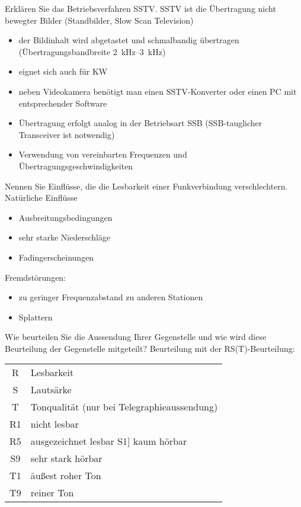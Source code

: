 \documentclass[avery5371,grid,frame,a4paper]{flashcards}
\newcommand{\card}[3]{
  \begin{flashcard}[{\chap} -- #1]{#2}#3\end{flashcard}
}
\begin{document}
\card{67}{Erklären Sie das Betriebsverfahren SSTV.}{
  \footnotesize
  SSTV ist die Übertragung nicht bewegter Bilder (Standbilder, Slow Scan Television)
  \begin{itemize}
    \item der Bildinhalt wird abgetastet und schmalbandig übertragen (Übertragungsbandbreite \SIrange{2}{3}{\kilo\Hz})
    \item eignet sich auch für KW
    \item neben Videokamera benötigt man einen SSTV-Konverter oder einen PC mit entsprechender Software
    \item Übertragung erfolgt analog in der Betriebsart SSB (SSB-tauglicher Transceiver ist notwendig)
    \item Verwendung von vereinbarten Frequenzen und Übertragungsgeschwindigkeiten
  \end{itemize}
}
\card{68}{Nennen Sie Einflüsse, die die Lesbarkeit einer Funkverbindung verschlechtern.}{
  \small
  Natürliche Einflüsse
  \begin{itemize}
    \item Ausbreitungsbedingungen
    \item sehr starke Niederschläge
    \item Fadingerscheinungen
  \end{itemize}

  Fremdstörungen:
  \begin{itemize}
    \item zu geringer Frequenzabstand zu anderen Stationen
    \item Splattern
  \end{itemize}
}
\card{69}{Wie beurteilen Sie die Aussendung Ihrer Gegenstelle und wie wird diese Beurteilung der Gegenstelle mitgeteilt?}{
  Beurteilung mit der RS(T)-Beurteilung:

  \begin{tabular}{cl}
    R & Lesbarkeit \\
    S & Lautsärke \\
    T & Tonqualität (nur bei Telegraphieaussendung) \\

    R1 & nicht lesbar \\
    R5 & ausgezeichnet lesbar S1] kaum hörbar \\
    S9 & sehr stark hörbar \\
    T1 & äußest roher Ton \\
    T9 & reiner Ton \\
  \end{tabular}
}
\end{document}

